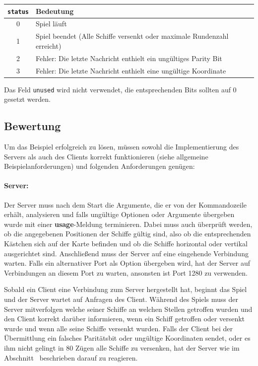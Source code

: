 {\centering
\begin{tabular}{ | c | l | }
\hline
\verb|status| & Bedeutung \\
\hline
0 & Spiel läuft \\
1 & Spiel beendet (Alle Schiffe versenkt oder maximale Rundenzahl erreicht) \\
2 & Fehler: Die letzte Nachricht enthielt ein ungültiges Parity Bit \\
3 & Fehler: Die letzte Nachricht enthielt eine ungültige Koordinate \\
\hline
\end{tabular}\par
}

Das Feld \verb|unused| wird nicht verwendet, die entsprechenden Bits sollten auf 0 gesetzt werden.

\subsection*{Bewertung}
\label{sec:grading}
Um das Beispiel erfolgreich zu lösen, müssen sowohl die Implementierung des
Servers als auch des Clients korrekt funktionieren (siehe allgemeine
Beispielanforderungen) und folgenden Anforderungen genügen:

\paragraph{Server:}

Der Server muss nach dem Start die Argumente, die er von der Kommandozeile erhält, analysieren
und falls ungültige Optionen oder Argumente übergeben wurde mit einer \textbf{usage}-Meldung terminieren.
Dabei muss auch überprüft werden, ob die angegebenen Positionen der Schiffe gültig sind,
also ob die entsprechenden Kästchen sich auf der Karte befinden und ob die Schiffe horizontal oder vertikal ausgerichtet sind.
Anschließend muss der Server auf eine eingehende Verbindung warten.
Falls ein alternativer Port als Option übergeben wird, hat der Server auf Verbindungen an diesem Port zu warten,
ansonsten ist Port 1280 zu verwenden.

Sobald ein Client eine Verbindung zum Server hergestellt hat, beginnt das Spiel und der Server wartet auf Anfragen des Client.
Während des Spiels muss der Server mitverfolgen welche seiner Schiffe an welchen Stellen getroffen wurden
und den Client korrekt darüber informieren, wenn ein Schiff getroffen oder versenkt wurde
und wenn alle seine Schiffe versenkt wurden.
Falls der Client bei der Übermittlung ein falsches Paritätsbit oder ungültige Koordinaten sendet,
oder es ihm nicht gelingt in 80 Zügen alle Schiffe zu versenken,
hat der Server wie im Abschnitt~ beschrieben darauf zu reagieren.

